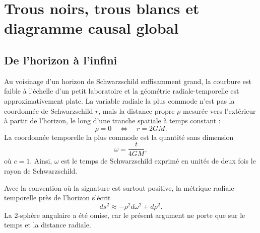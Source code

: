 \chapter{Trous noirs, trous blancs et diagramme causal global}


\section{De l’horizon à l’infini}

Au voisinage d’un horizon de Schwarzschild suffisamment grand, la courbure est faible à l’échelle d’un petit laboratoire et la géométrie radiale-temporelle est approximativement plate. La variable radiale la plus commode n’est pas la coordonnée de Schwarzschild \(r\), mais la distance propre \(\rho\) mesurée vers l’extérieur à partir de l’horizon, le long d’une tranche spatiale à temps constant :
\begin{equation}
\rho=0 \quad\Longleftrightarrow\quad r=2GM .
\label{eq:l04-rho-horizon}
\end{equation}
La coordonnée temporelle la plus commode est la quantité sans dimension
\begin{equation}
\omega=\frac{t}{4GM},
\label{eq:l04-omega}
\end{equation}
où \(c=1\). Ainsi, \(\omega\) est le temps de Schwarzschild exprimé en unités de deux fois le rayon de Schwarzschild.

Avec la convention où la signature est surtout positive, la métrique radiale-temporelle près de l’horizon s’écrit
\begin{equation}
ds^2\approx-\rho^2d\omega^2+d\rho^2.
\label{eq:l04-rindler}
\end{equation}
La 2-sphère angulaire a été omise, car le présent argument ne porte que sur le temps et la distance radiale.


